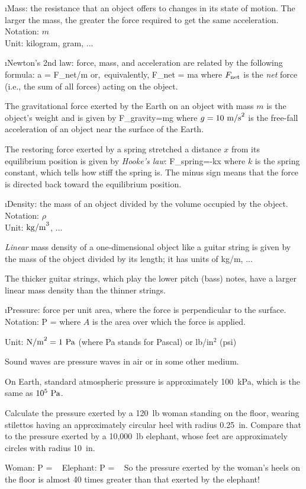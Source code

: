 \i Mass: 
the resistance that an object offers to changes in its state
of motion.
The larger the mass, the greater the force required to
get the same acceleration.
\\
Notation: $m$
\\
Unit: kilogram, gram, ...

\i Newton's 2nd law:
force, mass, and acceleration are related by the following formula:
%
\be
a = {F_{\rm net}}/{m} \quad
{\rm or,\ equivalently,}
\quad
F_{\rm net} = ma
\ee
%
where $F_{\rm net}$ is the {\em net} force (i.e., the sum of all forces) 
acting on the object.

\ex
The gravitational force exerted by the Earth on an object 
with mass $m$ is the object's weight and is given by 
%
\be
F_{\rm gravity}=mg
\ee
%
where $g=10~{\rm m/s}^2$ is the free-fall acceleration of
an object near the surface of the Earth.

\ex
The restoring force exerted by a spring stretched a distance
$x$ from its equilibrium position is given by {\em Hooke's law}:
%
\be
F_{\rm spring}=-kx
\ee
%
where $k$ is the spring constant, which tells how stiff the spring is.
The minus sign means that the force is directed back toward the 
equilibrium position.

\i Density:
the mass of an object divided by the volume occupied by the object.
\\
Notation: $\rho$
\\
Unit: ${\rm kg/m}^3$, ...

{\em Linear} mass density of a one-dimensional object like a guitar
string is given by the mass of the object divided by its length;
it has units of kg/m, ...

\ex The thicker guitar strings, which play the lower pitch (bass)
notes, have a larger linear mass density than the thinner strings.

\i Pressure:
force per unit area, where the force is perpendicular to the surface.
\\
Notation:
%
\be
P =
\ee
%
where $A$ is the area over which the force is applied.

Unit: ${\rm N/m}^2= 1~{\rm Pa}$ (where Pa stands for Pascal) or
lb/in$^2$ (psi)

\ex Sound waves are pressure waves in air or in some other 
medium.

\ex On Earth, standard atmospheric pressure is approximately 
100~kPa, which is the same as $10^5~{\rm Pa}$.

\exer Calculate the pressure exerted by a 120~lb woman 
standing on the floor, 
wearing stilettos having an approximately circular 
heel with radius 0.25~in.
Compare that to the pressure exerted by a 
10,000~lb elephant,
whose feet are approximately circles with radius 10~in.

\ans

Woman:
%
\be
P = 
~
\ee
%
%
Elephant:
%
\be
P = 
~
\ee
%
So the pressure exerted by the woman's heels on the floor 
is almost 40 times greater than that exerted by the elephant!

\ei
